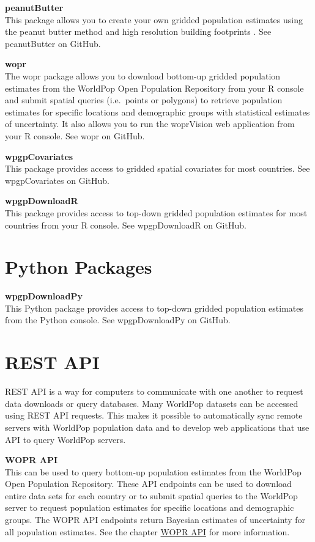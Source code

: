 \documentclass[]{book}
\begin{document}
\textbf{peanutButter}\\
This package allows you to create your own gridded population estimates
using the peanut butter method and high resolution building footprints
\citep{ecopia2020digitize}. See peanutButter on GitHub.

\textbf{wopr}\\
The wopr package \citep{leasure2020wopr} allows you to download
bottom-up gridded population estimates from the WorldPop Open Population
Repository from your R console and submit spatial queries (i.e.~points
or polygons) to retrieve population estimates for specific locations and
demographic groups with statistical estimates of uncertainty. It also
allows you to run the woprVision web application from your R console.
See wopr on GitHub.

\textbf{wpgpCovariates}\\
This package provides access to gridded spatial covariates
\citeyearpar[WorldPop et al.][]{worldpop2018global} for most countries.
See wpgpCovariates on GitHub.

\textbf{wpgpDownloadR}\\
This package provides access to top-down gridded population estimates
\citeyearpar[WorldPop et al.][]{worldpop2018global} for most countries
from your R console. See wpgpDownloadR on GitHub.

\section{Python Packages}\label{python-packages}

\textbf{wpgpDownloadPy}\\
This Python package provides access to top-down gridded population
estimates \citeyearpar[WorldPop et al.][]{worldpop2018global} from the
Python console. See wpgpDownloadPy on GitHub.

\section{REST API}\label{rest-api}

REST API is a way for computers to communicate with one another to
request data downloads or query databases. Many WorldPop datasets can be
accessed using REST API requests. This makes it possible to
automatically sync remote servers with WorldPop population data and to
develop web applications that use API to query WorldPop servers.

\textbf{WOPR API}\\
This can be used to query bottom-up population estimates from the
WorldPop Open Population Repository. These API endpoints can be used to
download entire data sets for each country or to submit spatial queries
to the WorldPop server to request population estimates for specific
locations and demographic groups. The WOPR API endpoints return Bayesian
estimates of uncertainty for all population estimates. See the chapter
\protect\hyperlink{wopr-api}{WOPR API} for more information.
\end{document}
